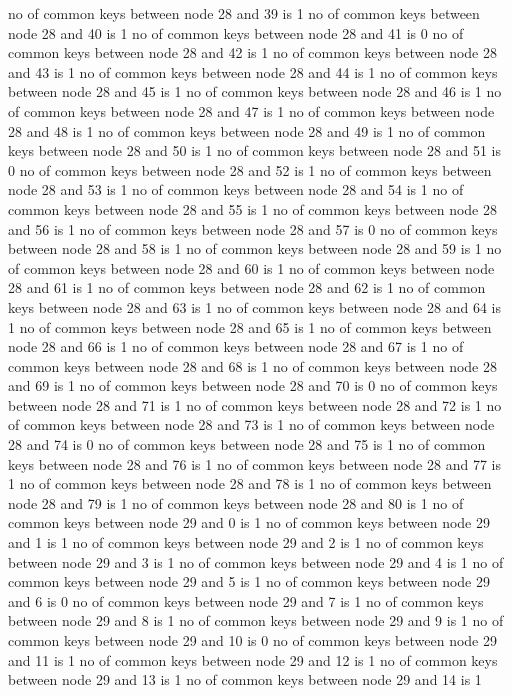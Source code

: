 no of common keys between node 28 and 39 is 1
no of common keys between node 28 and 40 is 1
no of common keys between node 28 and 41 is 0
no of common keys between node 28 and 42 is 1
no of common keys between node 28 and 43 is 1
no of common keys between node 28 and 44 is 1
no of common keys between node 28 and 45 is 1
no of common keys between node 28 and 46 is 1
no of common keys between node 28 and 47 is 1
no of common keys between node 28 and 48 is 1
no of common keys between node 28 and 49 is 1
no of common keys between node 28 and 50 is 1
no of common keys between node 28 and 51 is 0
no of common keys between node 28 and 52 is 1
no of common keys between node 28 and 53 is 1
no of common keys between node 28 and 54 is 1
no of common keys between node 28 and 55 is 1
no of common keys between node 28 and 56 is 1
no of common keys between node 28 and 57 is 0
no of common keys between node 28 and 58 is 1
no of common keys between node 28 and 59 is 1
no of common keys between node 28 and 60 is 1
no of common keys between node 28 and 61 is 1
no of common keys between node 28 and 62 is 1
no of common keys between node 28 and 63 is 1
no of common keys between node 28 and 64 is 1
no of common keys between node 28 and 65 is 1
no of common keys between node 28 and 66 is 1
no of common keys between node 28 and 67 is 1
no of common keys between node 28 and 68 is 1
no of common keys between node 28 and 69 is 1
no of common keys between node 28 and 70 is 0
no of common keys between node 28 and 71 is 1
no of common keys between node 28 and 72 is 1
no of common keys between node 28 and 73 is 1
no of common keys between node 28 and 74 is 0
no of common keys between node 28 and 75 is 1
no of common keys between node 28 and 76 is 1
no of common keys between node 28 and 77 is 1
no of common keys between node 28 and 78 is 1
no of common keys between node 28 and 79 is 1
no of common keys between node 28 and 80 is 1
no of common keys between node 29 and 0 is 1
no of common keys between node 29 and 1 is 1
no of common keys between node 29 and 2 is 1
no of common keys between node 29 and 3 is 1
no of common keys between node 29 and 4 is 1
no of common keys between node 29 and 5 is 1
no of common keys between node 29 and 6 is 0
no of common keys between node 29 and 7 is 1
no of common keys between node 29 and 8 is 1
no of common keys between node 29 and 9 is 1
no of common keys between node 29 and 10 is 0
no of common keys between node 29 and 11 is 1
no of common keys between node 29 and 12 is 1
no of common keys between node 29 and 13 is 1
no of common keys between node 29 and 14 is 1
